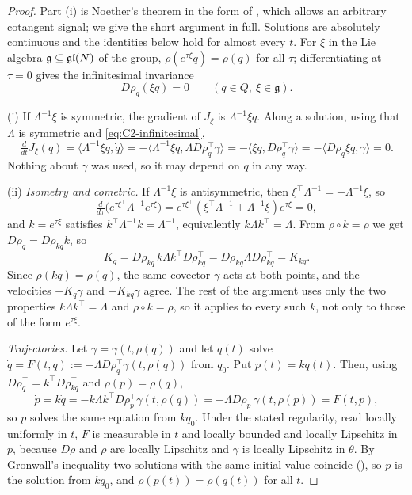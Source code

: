 \begin{proof}
Part (i) is Noether's theorem in the form of , which allows an arbitrary cotangent signal; we give the
short argument in full. Solutions are absolutely continuous and the identities below hold for almost
every $t$. For $\xi$ in the Lie algebra
$\mathfrak g\subseteq\mathfrak{gl}(N)$ of the group, $\rho(e^{\tau\xi}q)=\rho(q)$ for all $\tau$; differentiating at $\tau=0$
gives the infinitesimal invariance
\begin{equation}\label{eq:C2-infinitesimal}
D\rho_q(\xi q)=0\qquad(q\in Q,\ \xi\in\mathfrak g).
\end{equation}

(i) If $\Lambda^{-1}\xi$ is symmetric, the gradient of $J_\xi$ is $\Lambda^{-1}\xi q$. Along a solution, using that
$\Lambda$ is symmetric and \eqref{eq:C2-infinitesimal},
\[\tfrac{d}{dt}J_\xi(q)=\langle\Lambda^{-1}\xi q,\dot q\rangle=-\langle\Lambda^{-1}\xi q,\Lambda D\rho_q^\top\gamma\rangle
=-\langle\xi q,D\rho_q^\top\gamma\rangle=-\langle D\rho_q\xi q,\gamma\rangle=0.\]
Nothing about $\gamma$ was used, so it may depend on $q$ in any way.

(ii) \emph{Isometry and cometric.} If $\Lambda^{-1}\xi$ is antisymmetric, then $\xi^\top\Lambda^{-1}=-\Lambda^{-1}\xi$, so
\[\tfrac{d}{d\tau}\big(e^{\tau\xi^\top}\Lambda^{-1}e^{\tau\xi}\big)=e^{\tau\xi^\top}(\xi^\top\Lambda^{-1}+\Lambda^{-1}\xi)e^{\tau\xi}=0,\]
and $k=e^{\tau\xi}$ satisfies $k^\top\Lambda^{-1}k=\Lambda^{-1}$, equivalently $k\Lambda k^\top=\Lambda$. From
$\rho\circ k=\rho$ we get $D\rho_q=D\rho_{kq}k$, so
\[K_q=D\rho_{kq}\,k\Lambda k^\top D\rho_{kq}^\top=D\rho_{kq}\Lambda D\rho_{kq}^\top=K_{kq}.\]
Since $\rho(kq)=\rho(q)$, the same covector $\gamma$ acts at both points, and the velocities $-K_q\gamma$ and
$-K_{kq}\gamma$ agree. The rest of the argument uses only the two properties $k\Lambda k^\top=\Lambda$ and $\rho\circ k=\rho$,
so it applies to every such $k$, not only to those of the form $e^{\tau\xi}$.

\emph{Trajectories.} Let $\gamma=\gamma(t,\rho(q))$ and let $q(t)$ solve $\dot q=F(t,q):=-\Lambda D\rho_q^\top\gamma(t,\rho(q))$
from $q_0$. Put $p(t)=kq(t)$. Then, using $D\rho_q^\top=k^\top D\rho_{kq}^\top$ and $\rho(p)=\rho(q)$,
\[\dot p=k\dot q=-k\Lambda k^\top D\rho_p^\top\gamma(t,\rho(q))=-\Lambda D\rho_p^\top\gamma(t,\rho(p))=F(t,p),\]
so $p$ solves the same equation from $kq_0$. Under the stated regularity, read locally uniformly in $t$, $F$ is measurable in
$t$ and locally bounded and locally Lipschitz in $p$, because $D\rho$ and $\rho$ are locally Lipschitz and $\gamma$ is
locally Lipschitz in $\theta$. By Gronwall's inequality two solutions with the same initial value coincide (), so $p$ is the solution from
$kq_0$, and $\rho(p(t))=\rho(q(t))$ for all $t$.


\end{proof}
